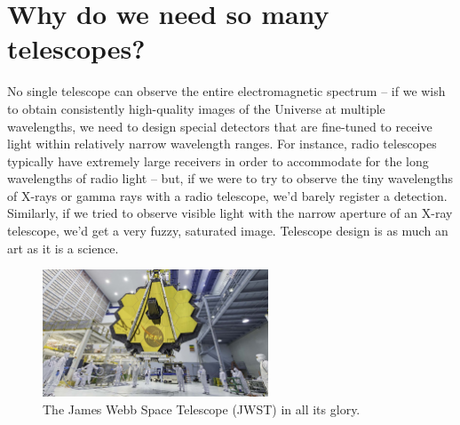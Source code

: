 \documentclass[11pt]{article}
\begin{document}
\section{Why do we need so many telescopes?}

No single telescope can observe the entire electromagnetic spectrum -- if we wish to obtain consistently high-quality images of the Universe at multiple wavelengths, we need to design special detectors that are fine-tuned to receive light within relatively narrow wavelength ranges. For instance, radio telescopes typically have extremely large receivers in order to accommodate for the long wavelengths of radio light -- but, if we were to try to observe the tiny wavelengths of X-rays or gamma rays with a radio telescope, we'd barely register a detection. Similarly, if we tried to observe visible light with the narrow aperture of an X-ray telescope, we'd get a very fuzzy, saturated image. Telescope design is as much an art as it is a science. 

\begin{figure}
    \centering
    \includegraphics[width=0.6\textwidth]{jwst.jpg}
    \caption{The James Webb Space Telescope (JWST) in all its glory.}
    \label{fig:jwst}
\end{figure}

\bigskip
\end{document}
